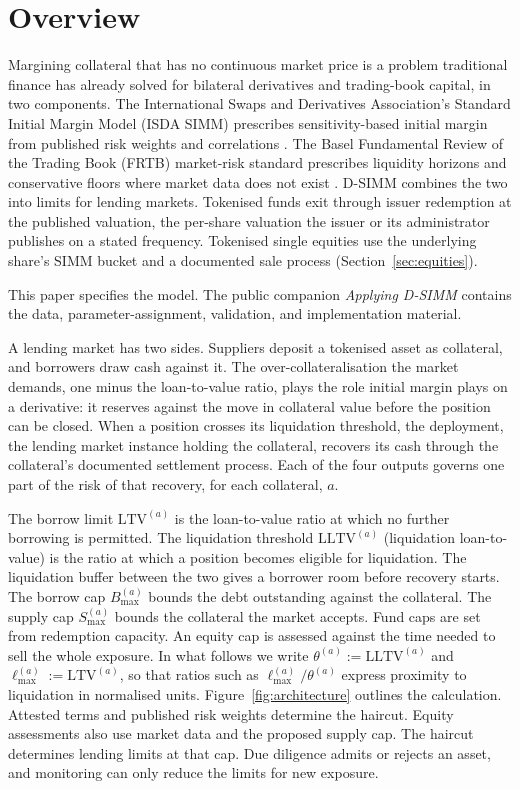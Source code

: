 \section{Overview}\label{sec:overview}
Margining collateral that has no continuous market price is a problem traditional finance has already solved for bilateral derivatives and trading-book capital, in two components. The International Swaps and Derivatives Association's Standard Initial Margin Model (ISDA SIMM) prescribes sensitivity-based initial margin from published risk weights and correlations \cite{isda_simm_v2_6}. The Basel Fundamental Review of the Trading Book (FRTB) market-risk standard prescribes liquidity horizons and conservative floors where market data does not exist \cite{bcbs_frtb_d457}. D-SIMM combines the two into limits for lending markets. Tokenised funds exit through issuer redemption at the published valuation, the per-share valuation the issuer or its administrator publishes on a stated frequency. Tokenised single equities use the underlying share's SIMM bucket and a documented sale process (Section~\ref{sec:equities}).

This paper specifies the model. The public companion \emph{Applying D-SIMM} contains the data, parameter-assignment, validation, and implementation material.

A lending market has two sides. Suppliers deposit a tokenised asset as collateral, and borrowers draw cash against it. The over-collateralisation the market demands, one minus the loan-to-value ratio, plays the role initial margin plays on a derivative: it reserves against the move in collateral value before the position can be closed. When a position crosses its liquidation threshold, the deployment, the lending market instance holding the collateral, recovers its cash through the collateral's documented settlement process. Each of the four outputs governs one part of the risk of that recovery, for each collateral, $a$.

The borrow limit $\mathrm{LTV}^{(a)}$ is the loan-to-value ratio at which no further borrowing is permitted. The liquidation threshold $\mathrm{LLTV}^{(a)}$ (liquidation loan-to-value) is the ratio at which a position becomes eligible for liquidation. The liquidation buffer between the two gives a borrower room before recovery starts. The borrow cap $B_{\max}^{(a)}$ bounds the debt outstanding against the collateral. The supply cap $S_{\max}^{(a)}$ bounds the collateral the market accepts. Fund caps are set from redemption capacity. An equity cap is assessed against the time needed to sell the whole exposure. In what follows we write $\theta^{(a)}:=\mathrm{LLTV}^{(a)}$ and $\ell_{\max}^{(a)}:=\mathrm{LTV}^{(a)}$, so that ratios such as $\ell_{\max}^{(a)}/\theta^{(a)}$ express proximity to liquidation in normalised units. Figure~\ref{fig:architecture} outlines the calculation. Attested terms and published risk weights determine the haircut. Equity assessments also use market data and the proposed supply cap. The haircut determines lending limits at that cap. Due diligence admits or rejects an asset, and monitoring can only reduce the limits for new exposure.

